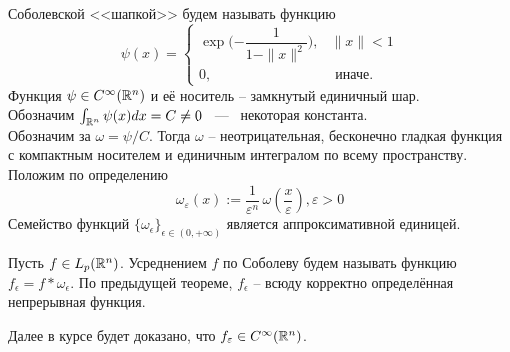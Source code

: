 \begin{example}
    Соболевской <<шапкой>> будем называть функцию
    \[
        \psi(x) = \begin{cases}
                      \exp\biggr({-\dfrac{1}{1 - \|x\|^2}}\biggr), & \|x\| < 1 \\
                      0, & \text{ иначе.}
        \end{cases}
    \]
    Функция $\psi \in C^{\infty}(\mathbb{R}^n)$ и её носитель -- замкнутый единичный шар. \\
    Обозначим $\int_{\mathbb{R}^n} \psi(x)dx = C \neq 0$ ~---~ некоторая константа. \\
    Обозначим за $\omega = \psi/C$.
    Тогда $\omega$ -- неотрицательная, бесконечно гладкая функция с компактным носителем и единичным интегралом по всему пространству. \\
    Положим по определению \[
\omega_\varepsilon(x) := \frac{1}{\varepsilon^n} \, \omega\left( \frac{x}{\varepsilon} \right), \varepsilon > 0
\]
    Семейство функций $\{\omega_\epsilon\}_{\epsilon \in (0, +\infty)}$ является аппроксимативной единицей.
\end{example}
\begin{definition}
        Пусть $f \in L_p(\mathbb{R}^n)$.
    Усреднением $f$ по Соболеву будем называть функцию $f_\epsilon = f * \omega_\epsilon$.
    По предыдущей теореме, $f_\epsilon$ -- всюду корректно определённая непрерывная функция.
\end{definition}

\begin{note}
    Далее в курсе будет доказано, что $f_{\varepsilon} \in C^{\infty}(\mathbb{R}^n)$.
\end{note}

